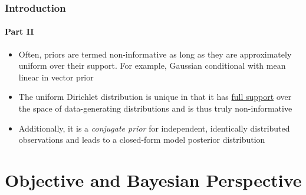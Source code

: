 \documentclass[aspectratio=169]{beamer}
\begin{document}
\begin{frame}
\frametitle{Introduction}
\framesubtitle{Part II}

\begin{itemize}
\item Often, priors are termed non-informative as long as they are approximately uniform over their support. For example, Gaussian conditional with mean linear in vector prior
\vspace{0.5em}
\item The uniform Dirichlet distribution is unique in that it has \underline{full support} over the space of data-generating distributions and is thus truly non-informative
\vspace{0.5em}
\item Additionally, it is a \emph{conjugate prior} for independent, identically distributed observations and leads to a closed-form model posterior distribution

\end{itemize}

\end{frame}



\section{Objective and Bayesian Perspective}
\end{document}
